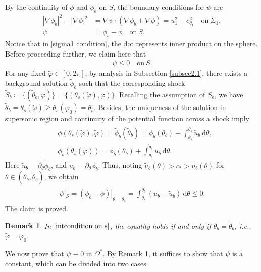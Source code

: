 \documentclass[10pt,a4paper]{amsart}
\newcommand{\dd}{\mathrm{d}}
\newtheorem{remark}{Remark}[section]
\numberwithin{equation}{section}
\begin{document}
By the continuity of $\phi$ and $\phi_b$ on $S$, the boundary conditions for $\psi$ are
	\begin{align}
	|\nabla \phi_b|^2-|\nabla \phi|^2&=\nabla\psi\cdot(\nabla\phi_b+\nabla\phi)=u_1^2-c_{\theta_1}^2\quad\text{on}~\Sigma_1,\label{sigma1 condition}\\
    \psi&=\phi_b-\phi\quad\text{on}~S.
	\end{align}
Notice that in \eqref{sigma1 condition}, the dot represents inner product on the sphere. Before proceeding further, we claim here that
	\begin{align}\label{condition on S}
		\psi\leq0\quad\text{on}~S.
	\end{align}
For any fixed $\tilde{\varphi}\in [0,2\pi]$, by analysis in Subsection \ref{subsec2.1}, there exists a background solution $\tilde{\phi}_b$ such that the corresponding shock $\tilde{S}_b\coloneqq\{(\tilde{\theta}_b,\varphi)\}=\{(\theta_s(\tilde{\varphi}),\varphi)\}$. Recalling the assumption of $S_b$, we have $\tilde{\theta}_b=\theta_s(\tilde{\varphi})\geq \theta_{s}(\varphi_0)=\theta_b$. Besides, the uniqueness of the solution in supersonic region and continuity of the potential function across a shock imply 
		\begin{align*}		&\phi(\theta_s(\tilde{\varphi}),\tilde{\varphi})=\tilde{\phi}_b(\tilde{\theta}_b)=\phi_b(\theta_b)+\int_{\theta_b}^{\tilde{\theta}_b}\tilde{u}_b~\dd\theta,\\		&\phi_b(\theta_s(\tilde{\varphi}))=\phi_b(\theta_b)+\int_{\theta_b}^{\tilde{\theta}_b}u_b~\dd\theta.
		\end{align*}
Here $\tilde{u}_b=\partial_\theta \tilde{\phi}_b$, and ${u}_b=\partial_\theta {\phi}_b$.  
Thus, noting $\tilde{u}_b(\theta)>c_*>u_b(\theta)$ for $\theta\in(\theta_b,\tilde{\theta}_b)$, we obtain
		\begin{align}\label{intcondition on s}
			\psi|_{S}=(\phi_b-\phi)|_{\theta=\theta_s}=\int_{\theta_b}^{\tilde{\theta}_b}(u_b-\tilde{u}_b)~\dd \theta \leq0.
			\end{align}
The claim is proved.
		
		\begin{remark}\label{psie0}
				In $\eqref{intcondition on s}$, the equality holds if and only if $\theta_b=\tilde{\theta}_b$, i.e., $\tilde{\varphi}=\varphi_0$.
		\end{remark}
		
We now prove that $\psi \equiv 0$ in $\Omega^*$. By Remark \ref{psie0}, it suffices to show that $\psi$ is a constant, which can be divided into two cases.
\end{document}
